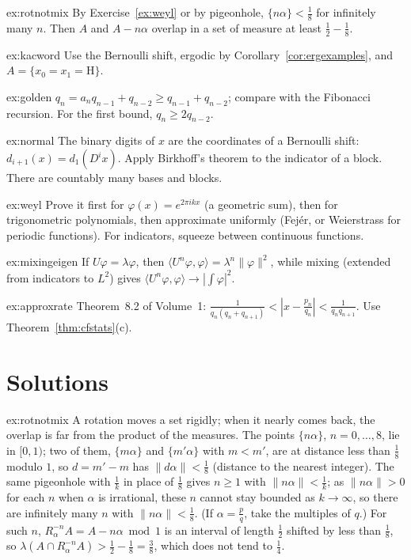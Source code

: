 \begin{hint}{ex:rotnotmix}
By Exercise~\ref{ex:weyl} or by pigeonhole, $\{n\alpha\}<\frac18$ for infinitely many $n$. Then $A$ and $A-n\alpha$ overlap in a set of measure at least $\frac12-\frac18$.
\end{hint}
\begin{hint}{ex:kacword}
Use the Bernoulli shift, ergodic by Corollary~\ref{cor:ergexamples}, and $A=\{x_0=x_1=\mathrm H\}$.
\end{hint}
\begin{hint}{ex:golden}
$q_n=a_nq_{n-1}+q_{n-2}\ge q_{n-1}+q_{n-2}$; compare with the Fibonacci recursion. For the first bound, $q_n\ge2q_{n-2}$.
\end{hint}
\begin{hint}{ex:normal}
The binary digits of $x$ are the coordinates of a Bernoulli shift: $d_{i+1}(x)=d_1(D^ix)$. Apply Birkhoff's theorem to the indicator of a block. There are countably many bases and blocks.
\end{hint}
\begin{hint}{ex:weyl}
Prove it first for $\varphi(x)=e^{2\pi ikx}$ (a geometric sum), then for trigonometric polynomials, then approximate uniformly (Fej\'er, or Weierstrass for periodic functions). For indicators, squeeze between continuous functions.
\end{hint}
\begin{hint}{ex:mixingeigen}
If $U\varphi=\lambda\varphi$, then $\langle U^n\varphi,\varphi\rangle=\lambda^n\|\varphi\|^2$, while mixing (extended from indicators to $L^2$) gives $\langle U^n\varphi,\varphi\rangle\to|\int\varphi|^2$.
\end{hint}
\begin{hint}{ex:approxrate}
Theorem~8.2 of Volume~1: $\frac1{q_n(q_n+q_{n+1})}<|x-\frac{p_n}{q_n}|<\frac1{q_nq_{n+1}}$. Use Theorem~\ref{thm:cfstats}(c).
\end{hint}

\section{Solutions}

\begin{solution}{ex:rotnotmix}
\idea A rotation moves a set rigidly; when it nearly comes back, the overlap is far from the product of the measures.
\writeup The points $\{n\alpha\}$, $n=0,\dots,8$, lie in $[0,1)$; two of them, $\{m\alpha\}$ and $\{m'\alpha\}$ with $m<m'$, are at distance less than $\frac18$ modulo $1$, so $d=m'-m$ has $\|d\alpha\|<\frac18$ (distance to the nearest integer). The same pigeonhole with $\frac1k$ in place of $\frac18$ gives $n\ge1$ with $\|n\alpha\|<\frac1k$; as $\|n\alpha\|>0$ for each $n$ when $\alpha$ is irrational, these $n$ cannot stay bounded as $k\to\infty$, so there are infinitely many $n$ with $\|n\alpha\|<\frac18$. (If $\alpha=\frac pq$, take the multiples of $q$.) For such $n$, $R_\alpha^{-n}A=A-n\alpha\bmod1$ is an interval of length $\frac12$ shifted by less than $\frac18$,
so $\lambda(A\cap R_\alpha^{-n}A)>\frac12-\frac18=\frac38$, which does not tend to $\frac14$.
\end{solution}

